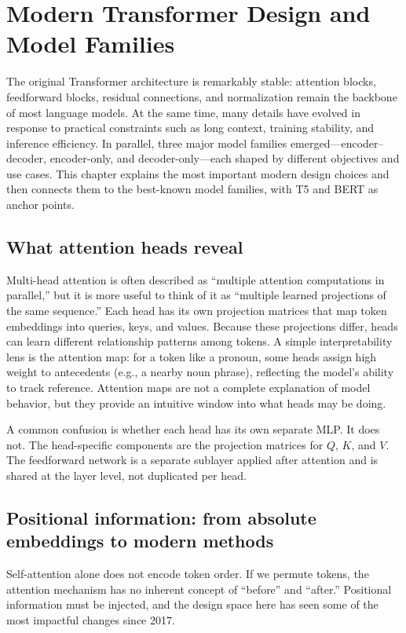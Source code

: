 
\chapter{Modern Transformer Design and Model Families}
\label{chap:modern-transformers-and-families}

The original Transformer architecture is remarkably stable: attention blocks, feedforward blocks, residual connections, and normalization remain the backbone of most language models. At the same time, many details have evolved in response to practical constraints such as long context, training stability, and inference efficiency. In parallel, three major model families emerged—encoder--decoder, encoder-only, and decoder-only—each shaped by different objectives and use cases. This chapter explains the most important modern design choices and then connects them to the best-known model families, with T5 and BERT as anchor points.

\section{What attention heads reveal}
Multi-head attention is often described as “multiple attention computations in parallel,” but it is more useful to think of it as “multiple learned projections of the same sequence.” Each head has its own projection matrices that map token embeddings into queries, keys, and values. Because these projections differ, heads can learn different relationship patterns among tokens. A simple interpretability lens is the attention map: for a token like a pronoun, some heads assign high weight to antecedents (e.g., a nearby noun phrase), reflecting the model’s ability to track reference. Attention maps are not a complete explanation of model behavior, but they provide an intuitive window into what heads may be doing.

A common confusion is whether each head has its own separate MLP. It does not. The head-specific components are the projection matrices for \(Q\), \(K\), and \(V\). The feedforward network is a separate sublayer applied after attention and is shared at the layer level, not duplicated per head.

\section{Positional information: from absolute embeddings to modern methods}
Self-attention alone does not encode token order. If we permute tokens, the attention mechanism has no inherent concept of “before” and “after.” Positional information must be injected, and the design space here has seen some of the most impactful changes since 2017.

